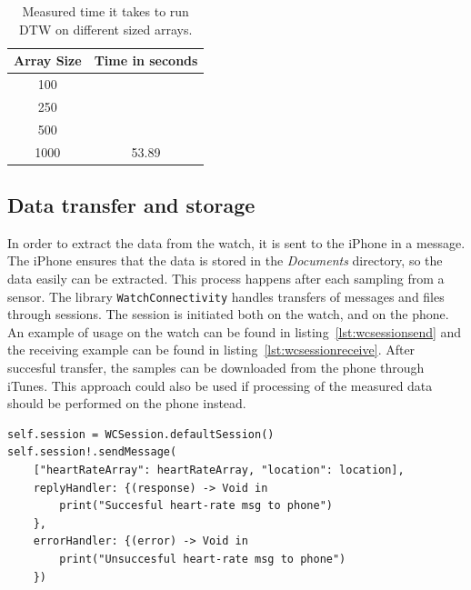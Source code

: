 \begin{table}[!h]
\caption{Measured time it takes to run DTW on different sized arrays.}
\label{tbl:dtw}
\centering
\begin{tabular}{ |c|c|  }
\hline
Array Size  & Time in seconds\\
\hline
100    &        \\
250    &        \\
500    &        \\
1000   & 53.89  \\
\hline
\end{tabular}
\end{table}

\subsection{Data transfer and storage}
In order to extract the data from the watch, it is sent to the iPhone in a
message. The iPhone ensures that the data is stored in the \textit{Documents}
directory, so the data easily can be extracted. This process happens after each
sampling from a sensor. The library \texttt{WatchConnectivity} handles transfers
of messages and files through sessions. The session is initiated both on the
watch, and on the phone. An example of usage on the watch can be found in 
listing~\ref{lst:wcsessionsend} and the receiving example can be found in 
listing~\ref{lst:wcsessionreceive}.
After succesful transfer, the samples can be downloaded from the phone through
iTunes.
This approach could also be used if processing of the measured data should be
performed on the phone instead.

\begin{lstlisting}[label={lst:wcsessionsend},caption={Send heart rate data to the
phone from the watch.},basicstyle=\small]
self.session = WCSession.defaultSession()
self.session!.sendMessage(
    ["heartRateArray": heartRateArray, "location": location],
    replyHandler: {(response) -> Void in
        print("Succesful heart-rate msg to phone")
    },
    errorHandler: {(error) -> Void in
        print("Unsuccesful heart-rate msg to phone")
    })
\end{lstlisting}

